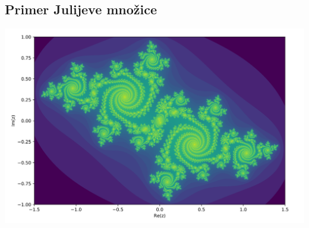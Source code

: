 \documentclass{beamer}
\begin{document}
\begin{frame}
    \section*{Primer Julijeve množice}

    \begin{center}
        \includegraphics[scale=0.25]{julia_set.png}
    \end{center}
\end{frame}
\end{document}
